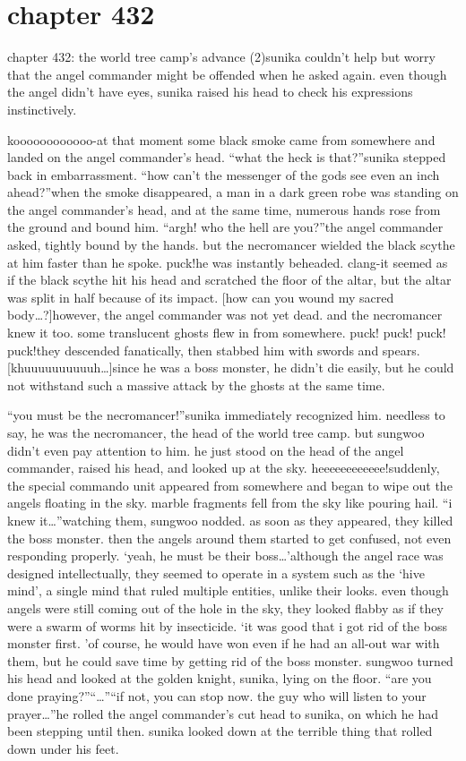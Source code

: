 \section{chapter 432}

chapter 432: the world tree camp’s advance (2)sunika couldn’t help but worry that the angel commander might be offended when he asked again.
 even though the angel didn’t have eyes, sunika raised his head to check his expressions instinctively.





koooooooooooo-at that moment some black smoke came from somewhere and landed on the angel commander’s head.
“what the heck is that?”sunika stepped back in embarrassment.
“how can’t the messenger of the gods see even an inch ahead?”when the smoke disappeared, a man in a dark green robe was standing on the angel commander’s head, and at the same time, numerous hands rose from the ground and bound him.
“argh! who the hell are you?”the angel commander asked, tightly bound by the hands.
 but the necromancer wielded the black scythe at him faster than he spoke.
puck!he was instantly beheaded.
clang-it seemed as if the black scythe hit his head and scratched the floor of the altar, but the altar was split in half because of its impact.
[how can you wound my sacred body…?]however, the angel commander was not yet dead.
 and the necromancer knew it too.
 some translucent ghosts flew in from somewhere.
puck! puck! puck! puck!they descended fanatically, then stabbed him with swords and spears.
[khuuuuuuuuuuh…]since he was a boss monster, he didn’t die easily, but he could not withstand such a massive attack by the ghosts at the same time.

“you must be the necromancer!”sunika immediately recognized him.
 needless to say, he was the necromancer, the head of the world tree camp.
but sungwoo didn’t even pay attention to him.
 he just stood on the head of the angel commander, raised his head, and looked up at the sky.
heeeeeeeeeeee!suddenly, the special commando unit appeared from somewhere and began to wipe out the angels floating in the sky.
marble fragments fell from the sky like pouring hail.
“i knew it…”watching them, sungwoo nodded.
 as soon as they appeared, they killed the boss monster.
then the angels around them started to get confused, not even responding properly.
 ‘yeah, he must be their boss…’although the angel race was designed intellectually, they seemed to operate in a system such as the ‘hive mind’, a single mind that ruled multiple entities, unlike their looks.
even though angels were still coming out of the hole in the sky, they looked flabby as if they were a swarm of worms hit by insecticide.
‘it was good that i got rid of the boss monster first.
’of course, he would have won even if he had an all-out war with them, but he could save time by getting rid of the boss monster.
sungwoo turned his head and looked at the golden knight, sunika, lying on the floor.
“are you done praying?”“…”“if not, you can stop now.
 the guy who will listen to your prayer…”he rolled the angel commander’s cut head to sunika, on which he had been stepping until then.
 sunika looked down at the terrible thing that rolled down under his feet.


